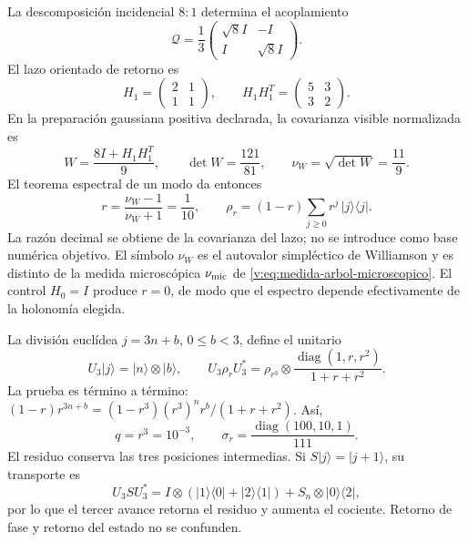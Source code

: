 La descomposición incidencial $8{:}1$ determina el acoplamiento
\[
 \mathcal Q=\frac13
 \begin{pmatrix}\sqrt8 I&-I\\ I&\sqrt8 I\end{pmatrix}.
\]
El lazo orientado de retorno es
\[
 H_1=\begin{pmatrix}2&1\\1&1\end{pmatrix},\qquad
 H_1H_1^T=\begin{pmatrix}5&3\\3&2\end{pmatrix}.
\]
En la preparación gaussiana positiva declarada, la covarianza visible
normalizada es
\begin{equation}
 W=\frac{8I+H_1H_1^T}{9},\qquad
 \det W=\frac{121}{81},\qquad
 \nu_W=\sqrt{\det W}=\frac{11}{9}.
 \label{v:eq:williamson-decimal}
\end{equation}
El teorema espectral de un modo da entonces
\begin{equation}
 r=\frac{\nu_W-1}{\nu_W+1}=\frac1{10},\qquad
 \rho_r=(1-r)\sum_{j\ge0}r^j\,|j\rangle\langle j|.
 \label{v:eq:estado-geometrico-decimal}
\end{equation}
La razón decimal se obtiene de la covarianza del lazo; no se introduce como
base numérica objetivo. El símbolo $\nu_W$ es el autovalor simpléctico de
Williamson y es distinto de la medida microscópica $\nu_{\rm mic}$ de
\eqref{v:eq:medida-arbol-microscopico}. El control $H_0=I$ produce $r=0$,
de modo que el espectro depende efectivamente de la holonomía elegida.

La división euclídea $j=3n+b$, $0\le b<3$, define el unitario
\begin{equation}
 U_3|j\rangle=|n\rangle\otimes|b\rangle,\qquad
 U_3\rho_rU_3^*=\rho_{r^3}\otimes
 \frac{\operatorname{diag}(1,r,r^2)}{1+r+r^2}.
 \label{v:eq:agrupamiento-tritico-espectral}
\end{equation}
La prueba es término a término:
$(1-r)r^{3n+b}=(1-r^3)(r^3)^n r^b/(1+r+r^2)$.
Así,
\begin{equation}
 q=r^3=10^{-3},\qquad
 \sigma_r=\frac{\operatorname{diag}(100,10,1)}{111}.
 \label{v:eq:razon-milenaria-y-residuo}
\end{equation}
El residuo conserva las tres posiciones intermedias. Si $S|j\rangle=|j+1\rangle$,
su transporte es
\[
 U_3SU_3^*=I\otimes(|1\rangle\langle0|+|2\rangle\langle1|)
 +S_n\otimes|0\rangle\langle2|,
\]
por lo que el tercer avance retorna el residuo y aumenta el cociente. Retorno
de fase y retorno del estado no se confunden.

